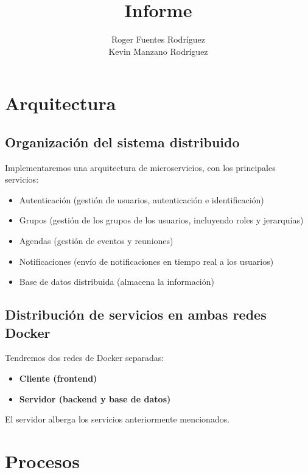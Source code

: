 \documentclass[11pt,a4paper]{article}
\title{Informe}
\author{
  Roger Fuentes Rodr\'iguez \\
  Kevin Manzano Rodr\'iguez
}
\date{}
\begin{document}
\maketitle

\tableofcontents

\section{Arquitectura}

\subsection{Organizaci\'on del sistema distribuido}
Implementaremos una arquitectura de microservicios, con los principales servicios: 
\begin{itemize}
    \item Autenticaci\'on (gesti\'on de usuarios, autenticaci\'on e identificaci\'on)
    \item Grupos (gesti\'on de los grupos de los usuarios, incluyendo roles y jerarquías)
    \item Agendas (gesti\'on de eventos y reuniones)
    \item Notificaciones (envío de notificaciones en tiempo real a los usuarios)
    \item Base de datos distribuida (almacena la informaci\'on)
\end{itemize}

\subsection{Distribuci\'on de servicios en ambas redes Docker}
Tendremos dos redes de Docker separadas: 
\begin{itemize}
    \item \textbf{Cliente (frontend)}
    \item \textbf{Servidor (backend y base de datos)}
\end{itemize}
El servidor alberga los servicios anteriormente mencionados.

\section{Procesos}
\end{document}
